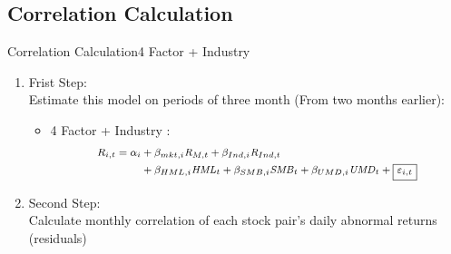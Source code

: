 \documentclass[handout]{beamer}
\begin{document}
	\subsection{Correlation Calculation}
	\begin{frame}{Correlation Calculation}{4 Factor + Industry}
		
		\begin{enumerate}\footnotesize
			\item Frist Step:\\
			\scriptsize
			Estimate this model on periods of three month (From two months earlier):
			\begin{itemize}
				
				\item 4 Factor + Industry : 
				\begin{equation*}\footnotesize
					\begin{split}
						R_{i,t} =\alpha _{i}&+\beta _{mkt,i}{\mathit {R}}_{M,t} + \beta_{Ind,i}{\mathit {R}}_{Ind,t} \\
						&+\beta _{HML,i}{\mathit {HML}}_{t}+\beta _{SMB,i}{\mathit {SMB}}_{t}+\beta _{UMD,i}{\mathit {UMD}}_{t}+ \boxed{\varepsilon_{i,t}}
					\end{split}
					\label{e10}
				\end{equation*}
			\end{itemize}
			
			\item Second Step:\\
			\scriptsize
			Calculate monthly correlation of each stock pair’s daily abnormal returns (residuals)
			

\end{enumerate}
\end{frame}
\end{document}
